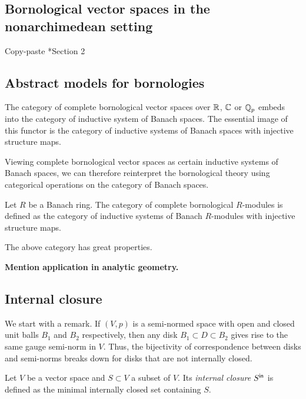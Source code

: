 \subsection{Bornological vector spaces in the nonarchimedean setting}


Copy-paste \cite{Cortinas-Cuntz-Meyer-Tamme:Nonarchimedean}*{Section 2}


\subsection{Abstract models for bornologies}


\begin{theorem}
The category of complete bornological vector spaces over \(\mathbb R\), \(\mathbb C\) or \(\mathbb Q_p\) embeds into the category of inductive system of Banach spaces. The essential image of this functor is the category of inductive systems of Banach spaces with injective structure maps.
\end{theorem}

Viewing complete bornological vector spaces as certain inductive systems of Banach spaces, we can therefore reinterpret the bornological theory using categorical operations on the category of Banach spaces. 

\begin{definition}
Let \(R\) be a Banach ring. The category of complete bornological \(R\)-modules is defined as the category of inductive systems of Banach \(R\)-modules with injective structure maps.
\end{definition}


\begin{theorem}
The above category has great properties.
\end{theorem}


\textbf{Mention application in analytic geometry.}


\subsection{Internal closure}


We start with a remark. If $(V,p)$ is a 
semi-normed space with open and closed unit balls $B_1$ and $B_2$ respectively, 
then any disk $B_1 \subset D \subset B_2$ gives rise to 
the same gauge semi-norm in $V$. Thus, 
the bijectivity of correspondence between
disks and semi-norms breaks down for disks that are not internally closed.

\begin{definition}
Let $V$ be a vector space and $S \subset V$ a subset of $V$. 
Its \emph{internal closure} $S^{\mathsf{in}}$ is defined as the minimal
internally closed set containing $S$.
\end{definition}

